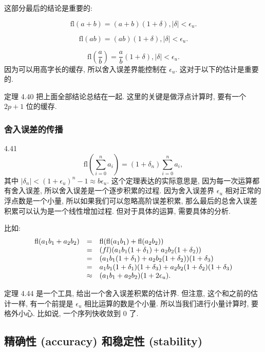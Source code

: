 \documentclass[a4paper]{ctexart}
\begin{document}
{%

这部分最后的结论是重要的:

$$
\mbox{fl}(a + b) = (a + b)(1 + \delta), |\delta| < \epsilon_u.
$$

$$
\mbox{fl}(ab) = (ab)(1 + \delta), |\delta| < \epsilon_u.
$$

$$
\mbox{fl}(\frac{a}{b}) = \frac{a}{b}(1 + \delta), |\delta| < \epsilon_u.
$$
因为可以用高字长的缓存, 所以舍入误差界能控制在 $\epsilon_u$.
这对于以下的估计是重要的. 

定理 4.40 把上面全部结论总结在一起. 这里的关键是做浮点计算时,
要有一个 $2p + 1$ 位的缓存.

\subsubsection{舍入误差的传播}

 4.41
$$
\mbox{fl}\left(\sum_{i = 0}^n a_i\right) = (1 + \delta_n)\sum_{i = 0}^n a_i,
$$
其中 $|\delta_n| < (1 + \epsilon_u)^n - 1 \approx b \epsilon_u$.
这个定理表达的实际意思是, 因为每一次运算都有舍入误差, 所以舍入误差是一个逐步积累的过程.
因为舍入误差界 $\epsilon_u$ 相对正常的浮点数是一个小量, 所以如果我们可以忽略高阶误差积累,
那么最后的总舍入误差积累可以认为是一个线性增加过程. 但对于具体的运算, 需要具体的分析.

比如:
$$
\begin{array}{rcl}
  \mbox{fl}(a_1b_1 + a_2b_2) &=& \mbox{fl}(\mbox{fl}(a_1b_1) + \mbox{fl}(a_2b_2)) \\
  &=&\mbox(fl)(a_1b_1(1 + \delta_1) + a_2b_2(1 + \delta_2))\\
  &=&(a_1b_1(1+ \delta_1) + a_2b_2(1 + \delta_2))(1 + \delta_3) \\
  &=&a_1b_1(1 + \delta_1)(1 + \delta_3) + a_2b_2(1 + \delta_2)(1 + \delta_3)\\
  &\approx&(a_1b_1 + a_2b_2)(1 + 2\epsilon_u).
\end{array}
$$

定理 4.44 是一个工具, 给出一个舍入误差积累的估计界. 但注意, 这个和之前的估计一样,
有一个前提是 $\epsilon_u$ 相比运算的数是个小量. 所以当我们进行小量计算时, 要格外小心.
比如说, 一个序列快收敛到 $0$ 了.

\subsection{精确性 (accuracy) 和稳定性 (stability)}

}
\end{document}
